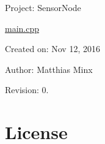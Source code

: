 Project\+: Sensor\+Node

\hyperlink{main_8cpp}{main.\+cpp}

Created on\+: Nov 12, 2016

Author\+: Matthias Minx

Revision\+: 0.\hypertarget{main.cpp_License}{}\section{License}\label{main.cpp_License}
